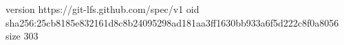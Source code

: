 version https://git-lfs.github.com/spec/v1
oid sha256:25cb8185e832161d8c8b24095298ad181aa3ff1630bb933a6f5d222c8f0a8056
size 303
